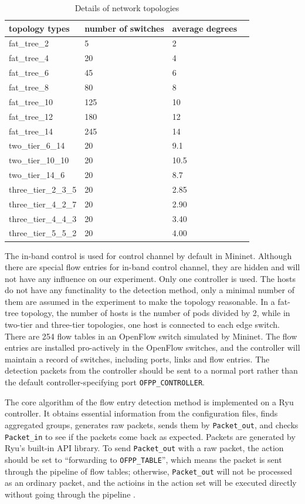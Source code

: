\documentclass[conference]{IEEEtran}
\begin{document}
\begin{table}[ht]
\centering
\caption{Details of network topologies}
\begin{tabular}{|l|l|l|l|}
\hline topology types & number of switches & average degrees \\
\hline
\hline fat\_tree\_2 & 5 & 2 \\
\hline fat\_tree\_4 & 20 & 4 \\
\hline fat\_tree\_6 & 45 & 6 \\
\hline fat\_tree\_8 & 80 & 8 \\
\hline fat\_tree\_10 & 125 & 10 \\
\hline fat\_tree\_12 & 180 & 12 \\
\hline fat\_tree\_14 & 245 & 14 \\
\hline two\_tier\_6\_14 & 20 & 9.1 \\
\hline two\_tier\_10\_10 & 20 & 10.5 \\
\hline two\_tier\_14\_6 & 20 & 8.7 \\
\hline three\_tier\_2\_3\_5 & 20 & 2.85 \\
\hline three\_tier\_4\_2\_7 & 20 & 2.90 \\
\hline three\_tier\_4\_4\_3 & 20 & 3.40 \\
\hline three\_tier\_5\_5\_2 & 20 & 4.00 \\
\hline 
\end{tabular}
\label{table:network_env}
\end{table}

The in-band control is used for control channel by default in Mininet. Although there are special flow entries for in-band control channel, they are hidden and will not have any influence on our experiment. Only one controller is used. The hosts do not have any functinality to the detection method, only a minimal number of them are assumed in the experiment to make the topology reasonable. In a fat-tree topology, the number of hosts is the number of pods divided by 2, while in two-tier and three-tier topologies, one host is connected to each edge switch. There are 254 flow tables in an OpenFlow switch simulated by Mininet. The flow entries are installed pro-actively in the OpenFlow switches, and the controller will maintain a record of switches, including ports, links and flow entries. The detection packets from the controller should be sent to a normal port rather than the default controller-specifying port \texttt{OFPP\_CONTROLLER}.

The core algorithm of the flow entry detection method is implemented on a Ryu controller. It obtains essential information from the configuration files, finds aggregated groups, generates raw packets, sends them by \texttt{Packet\_out}, and checks \texttt{Packet\_in} to see if the packets come back as expected. Packets are generated by Ryu's built-in API library. To send \texttt{Packet\_out} with a raw packet, the action should be set to ``forwarding to \texttt{OFPP\_TABLE}'', which means the packet is sent through the pipeline of flow tables; otherwise, \texttt{Packet\_out} will not be processed as an ordinary packet, and the actioins in the action set will be executed directly without going through the pipeline \cite{PACKETOUT}. 
\end{document}
